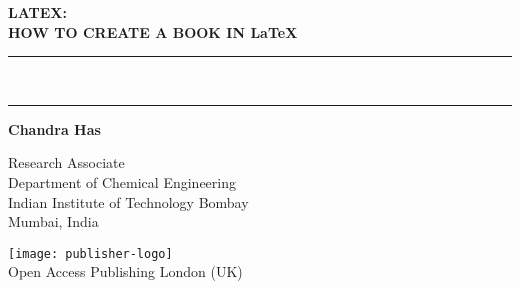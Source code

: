 
{}
{
\centering
\Huge\bfseries LATEX:\\
 HOW TO CREATE A BOOK IN \LaTeX\\[-4mm]
\color{red}  
 \rule{\linewidth}{1pt}\\[-6mm]
 \rule{\linewidth}{2pt}
}


\vskip3cm
{\noindent \LARGE \bfseries  Chandra Has}

\noindent Research Associate\\
Department of Chemical Engineering\\
Indian Institute of Technology Bombay\\
Mumbai, India

\vfill 
\texttt{[image: publisher-logo]}\\[1mm]
Open Access Publishing London (UK)

\clearpage